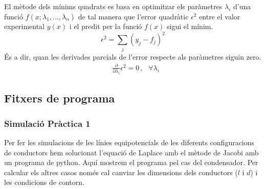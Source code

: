 \documentclass[11pt]{article}
\numberwithin{equation}{section}
\numberwithin{figure}{section}
\numberwithin{table}{section}
\begin{document}
El mètode dels mínims quadrats es basa en optimitzar els paràmetres $\lambda_i$ d'una funció $f(x;\lambda_1,...,\lambda_n)$ de tal manera que l'error quadràtic $\epsilon^2$ entre el valor experimental $y(x)$ i el predit per la funció $f(x)$ sigui el mínim.
\begin{equation}
    \epsilon^2 = \sum_j(y_j-f_j)^2
\end{equation}
És a dir, quan les derivades parcials de l'error respecte als paràmetres siguin zero.
\begin{align}
     & \frac{\partial}{\partial\lambda_i}\epsilon^2 = 0 \, , \,\,\,\, \forall \lambda_i
\end{align}

\subsection{Fitxers de programa}
\subsubsection{Simulació Pràctica 1}\label{sec: python}
Per fer les simulacions de les línies equipotencials de les diferents configuracions de conductors hem solucionat l'equació de Laplace amb el mètode de Jacobi amb un programa de python. Aquí mostrem el programa pel cas del condensador. Per calcular els altres casos només cal canviar les dimensions dels conductors ($l$ i $d$) i les condicions de contorn.
\end{document}
